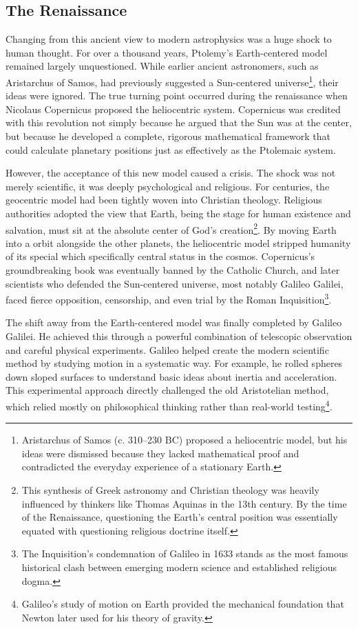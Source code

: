 \documentclass[10pt,a4paper]{article}
\begin{document}
\subsection{The Renaissance}
Changing from this ancient view to modern astrophysics was a huge shock to human thought. For over a thousand years, Ptolemy's Earth-centered model remained largely unquestioned. While earlier ancient astronomers, such as Aristarchus of Samos, had previously suggested a Sun-centered universe\footnote{Aristarchus of Samos (c. 310–230 BC) proposed a heliocentric model, but his ideas were dismissed because they lacked mathematical proof and contradicted the everyday experience of a stationary Earth.}, their ideas were ignored. The true turning point occurred during the renaissance when Nicolaus Copernicus proposed the heliocentric system. Copernicus was credited with this revolution not simply because he argued that the Sun was at the center, but because he developed a complete, rigorous mathematical framework that could calculate planetary positions just as effectively as the Ptolemaic system.  

However, the acceptance of this new model caused a crisis. The shock was not merely scientific, it was deeply psychological and religious. For centuries, the geocentric model had been tightly woven into Christian theology. Religious authorities adopted the view that Earth, being the stage for human existence and salvation, must sit at the absolute center of God's creation\footnote{This synthesis of Greek astronomy and Christian theology was heavily influenced by thinkers like Thomas Aquinas in the 13th century. By the time of the Renaissance, questioning the Earth's central position was essentially equated with questioning religious doctrine itself.}. By moving Earth into a orbit alongside the other planets, the heliocentric model stripped humanity of its special which specifically central status in the cosmos. Copernicus's groundbreaking book was eventually banned by the Catholic Church, and later scientists who defended the Sun-centered universe, most notably Galileo Galilei, faced fierce opposition, censorship, and even trial by the Roman Inquisition\footnote{The Inquisition's condemnation of Galileo in 1633 stands as the most famous historical clash between emerging modern science and established religious dogma.}.

The shift away from the Earth-centered model was finally completed by Galileo Galilei. He achieved this through a powerful combination of telescopic observation and careful physical experiments. Galileo helped create the modern scientific method by studying motion in a systematic way. For example, he rolled spheres down sloped surfaces to understand basic ideas about inertia and acceleration. This experimental approach directly challenged the old Aristotelian method, which relied mostly on philosophical thinking rather than real-world testing\footnote{Galileo's study of motion on Earth provided the mechanical foundation that Newton later used for his theory of gravity.}.
\end{document}

